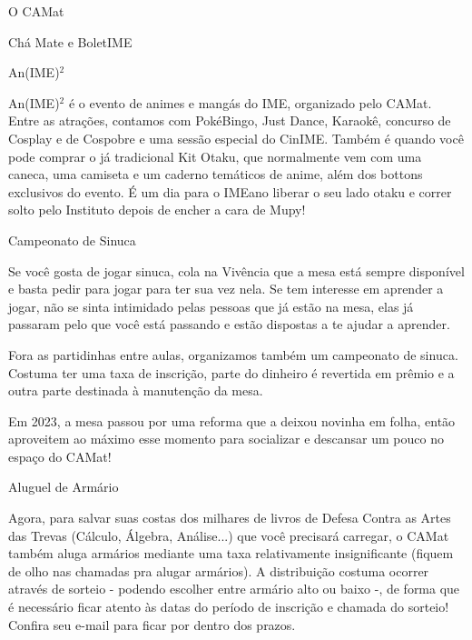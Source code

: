 \begin{secao}{O CAMat}
\begin{subsecao}{Chá Mate e BoletIME}
\end{subsecao}


\begin{subsecao}{An(IME)\texorpdfstring{$^2$}{²}}

An(IME)$^2$ é o evento de animes e mangás do IME, organizado pelo CAMat. Entre as atrações,
contamos com PokéBingo, Just Dance, Karaokê, concurso de Cosplay e de Cospobre e uma sessão 
especial do CinIME.
Também é quando você pode comprar o já tradicional Kit Otaku, que normalmente vem com uma
caneca, uma camiseta e um caderno temáticos de anime, além dos bottons exclusivos do evento.
É um dia para o IMEano liberar o seu lado otaku e correr solto pelo Instituto depois de
encher a cara de Mupy!

\end{subsecao}

\begin{subsecao}{Campeonato de Sinuca}

Se você gosta de jogar sinuca, cola na Vivência que a mesa está sempre disponível
e basta pedir para jogar para ter sua vez nela. Se tem interesse em aprender a jogar,
não se sinta intimidado pelas pessoas que já estão na mesa, elas já passaram pelo
que você está passando e estão dispostas a te ajudar a aprender.

Fora as partidinhas entre aulas, organizamos também um campeonato de sinuca. Costuma
ter uma taxa de inscrição, parte do dinheiro é revertida em prêmio e a outra parte
destinada à manutenção da mesa.

Em 2023, a mesa passou por uma reforma que a deixou novinha em folha, então aproveitem
ao máximo esse momento para socializar e descansar um pouco no espaço do CAMat! %

\end{subsecao}


\begin{subsecao}{Aluguel de Armário}

Agora, para salvar suas costas dos milhares de livros de Defesa Contra as Artes
das Trevas (Cálculo, Álgebra, Análise...) que você precisará carregar, o CAMat
também aluga armários mediante uma taxa relativamente insignificante (fiquem de olho
nas chamadas pra alugar armários). A distribuição costuma ocorrer através de sorteio -
podendo escolher entre armário alto ou baixo -, de forma que é necessário ficar atento
às datas do período de inscrição e chamada do sorteio! Confira seu e-mail para ficar por 
dentro dos prazos.

\end{subsecao}


\end{secao}
